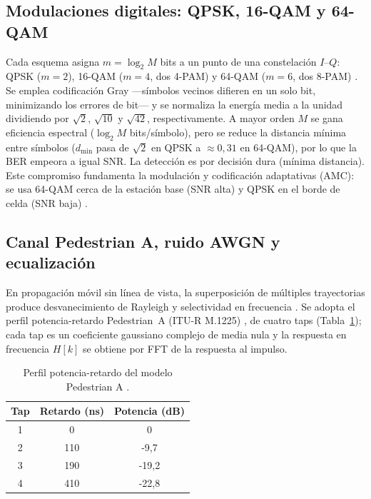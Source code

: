 \documentclass[conference,onecolumn]{IEEEtran}
\begin{document}
\subsection{Modulaciones digitales: QPSK, 16-QAM y 64-QAM}

Cada esquema asigna $m=\log_2 M$ bits a un punto de una constelaci\'on $I$--$Q$: QPSK ($m{=}2$), 16-QAM ($m{=}4$, dos 4-PAM) y 64-QAM ($m{=}6$, dos 8-PAM) \cite{proakis2008digital}. Se emplea codificaci\'on Gray ---s\'imbolos vecinos difieren en un solo bit, minimizando los errores de bit--- y se normaliza la energ\'ia media a la unidad dividiendo por $\sqrt{2}$, $\sqrt{10}$ y $\sqrt{42}$, respectivamente. A mayor orden $M$ se gana eficiencia espectral ($\log_2 M$ bits/s\'imbolo), pero se reduce la distancia m\'inima entre s\'imbolos ($d_{\min}$ pasa de $\sqrt{2}$ en QPSK a $\approx 0{,}31$ en 64-QAM), por lo que la BER empeora a igual SNR. La detecci\'on es por decisi\'on dura (m\'inima distancia). Este compromiso fundamenta la modulaci\'on y codificaci\'on adaptativas (AMC): se usa 64-QAM cerca de la estaci\'on base (SNR alta) y QPSK en el borde de celda (SNR baja) \cite{goldsmith2005wireless}.

\subsection{Canal Pedestrian A, ruido AWGN y ecualizaci\'on}

En propagaci\'on m\'ovil sin l\'inea de vista, la superposici\'on de m\'ultiples trayectorias produce desvanecimiento de Rayleigh y selectividad en frecuencia \cite{rappaport2002}. Se adopta el perfil potencia-retardo Pedestrian~A (ITU-R M.1225) \cite{ituR1225}, de cuatro taps (Tabla~\ref{tab:pedA}); cada tap es un coeficiente gaussiano complejo de media nula y la respuesta en frecuencia $H[k]$ se obtiene por FFT de la respuesta al impulso.

\begin{table}[H]
    \renewcommand{\arraystretch}{1.2}
    \caption{Perfil potencia-retardo del modelo Pedestrian A \cite{ituR1225}.}
    \label{tab:pedA}
    \centering
    \begin{tabular}{ccc}
        \hline
        \textbf{Tap} & \textbf{Retardo (ns)} & \textbf{Potencia (dB)} \\
        \hline
        1 & 0   & 0       \\
        2 & 110 & -9{,}7  \\
        3 & 190 & -19{,}2 \\
        4 & 410 & -22{,}8 \\
        \hline
    \end{tabular}
\end{table}
\end{document}
